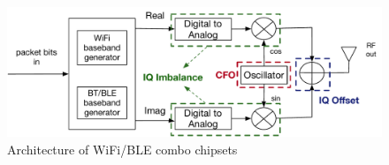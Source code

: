 
 



\begin{figure}[t!]
    \centering
    \includegraphics[width = \linewidth]{plots/IQchain.pdf} 
    \caption{Architecture of WiFi/BLE combo chipsets}
    \label{fig:iq_arch}
\end{figure}


